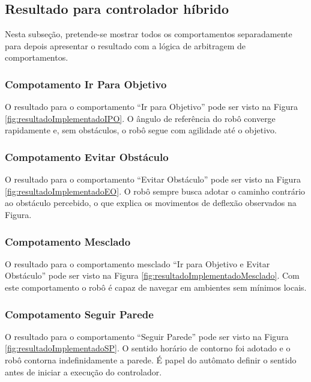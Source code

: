 	\subsection{Resultado para controlador híbrido}
	
	Nesta subseção, pretende-se mostrar todos os comportamentos separadamente para 
	depois apresentar o resultado com a lógica de arbitragem de comportamentos.
	
	\subsubsection{Compotamento Ir Para Objetivo}
	
	O resultado para o comportamento ``Ir para Objetivo'' pode ser visto na Figura
	\ref{fig:resultadoImplementadoIPO}. O ângulo de referência do robô converge rapidamente
	e, sem obstáculos, o robô segue com agilidade até o objetivo.
	
	
	
	\subsubsection{Compotamento Evitar Obstáculo}
	
	O resultado para o comportamento ``Evitar Obstáculo'' pode ser visto na Figura	
	\ref{fig:resultadoImplementadoEO}. O robô sempre busca adotar o caminho contrário
	ao obstáculo percebido, o que explica os movimentos de deflexão observados na Figura.
	
	
	
	\subsubsection{Compotamento Mesclado}
	
	O resultado para o comportamento mesclado ``Ir para Objetivo e Evitar Obstáculo'' pode 
	ser visto na Figura \ref{fig:resultadoImplementadoMesclado}. Com este comportamento
	o robô é capaz de navegar em ambientes sem mínimos locais.   
	
	
	
	\subsubsection{Compotamento Seguir Parede}
	
	O resultado para o comportamento ``Seguir Parede'' pode ser visto na Figura
	\ref{fig:resultadoImplementadoSP}. O sentido horário de contorno foi adotado
	e o robô contorna indefinidamente a parede. É papel do autômato definir o sentido 
	antes de iniciar a execução do controlador.
	

